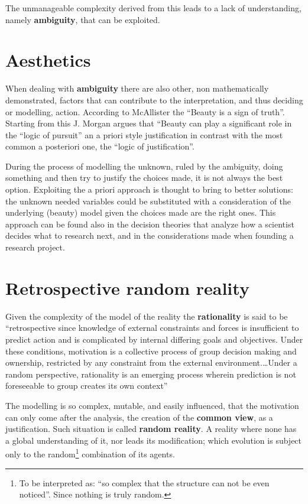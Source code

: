 The unmanageable complexity derived from this leads to a lack of understanding, namely
\textbf{ambiguity}, that can be exploited.


\section{Aesthetics}
When dealing with \textbf{ambiguity} there are also other, non mathematically demonstrated, factors that can contribute to the interpretation, and thus deciding or modelling, action.
According to McAllister the ``Beauty is a sign of truth''\cite{McAllister96,McAllister98}.
Starting from this J. Morgan argues that ``Beauty can play a significant role in the
``logic of pursuit''\cite{JMorgan} an a priori style justification in contrast
with the most common a posteriori one, the ``logic of justification''.

During the process of modelling  the unknown, ruled by the ambiguity, doing something and then
try to justify the choices made, it is not always the best option.
Exploiting the a priori approach is thought to bring to better solutions:
the unknown needed variables could be substituted with a consideration of the
underlying (beauty) model given the choices made are
the right ones.
This approach can be found also in the decision theories that analyze
how a scientist decides what to research next, and in the considerations made
when founding a research project\cite{JMorgan}.


\section{Retrospective random reality}
Given the complexity of the model of the reality the \textbf{rationality}
is said to be ``retrospective since knowledge of external constraints and forces
is insufficient to predict action and is complicated by internal differing goals
and objectives. Under these conditions, motivation is a collective process of
group decision making and ownership, restricted by any constraint from the
external environment.\dots{}Under a random perspective, rationality is an emerging process wherein prediction is not foreseeable to group creates its own context''\cite{Personell}

The modelling is so complex, mutable, and easily influenced, that the motivation can only come after the analysis, the creation of the \textbf{common view}, as a justification.
Such situation is called \textbf{random reality}. A reality where none has a
global understanding of it, nor leads its modification; which evolution is
subject only to the random\footnote{To be interpreted as: ``so complex that
the structure can not be even noticed''. Since nothing is truly random.}
combination of its agents.

